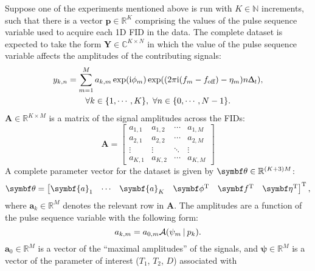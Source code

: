 Suppose one of the experiments mentioned above is run with $K \in \mathbb{N}$
increments,
such that there is a vector  $\symbf{p} \in \mathbb{R}^K$ comprising the
values of the pulse sequence variable used to acquire each \ac{1D} \ac{FID} in
the data.  The complete dataset is expected to take the form $\symbf{Y} \in
\mathbb{C}^{K \times N}$ in which the value of the pulse sequence variable
affects the amplitudes of the contributing signals:
\begin{equation}
    \begin{gathered}
        y_{k,n} = \sum_{m=1}^{M} a_{k,m} \exp(\mathrm{i} \phi_m)
        \exp((2 \pi \mathrm{i} (f_m - f_{\text{off}}) - \eta_m) n \Updelta_t),\\
        \forall k \in \lbrace 1, \cdots, K \rbrace,\ \forall n \in \lbrace 0,
        \cdots, N-1 \rbrace.
    \end{gathered}
\end{equation}
$\symbf{A} \in \mathbb{R}^{K \times M}$ is a matrix of the signal amplitudes
across the \acp{FID}:
\begin{equation}
    \symbf{A} =
    \begin{bmatrix}
        a_{1,1} & a_{1,2} & \cdots & a_{1,M}\\
        a_{2,1} & a_{2,2} & \cdots & a_{2,M}\\
        \vdots & \vdots & \ddots & \vdots\\
        a_{K,1} & a_{K,2} & \cdots & a_{K,M}
    \end{bmatrix}
\end{equation}
A complete parameter vector for the dataset is given by $\bth \in
\mathbb{R}^{(K + 3)M}$:
\begin{equation}
    \bth =
    \begin{bmatrix}
        \symbf{a}_1 & \cdots & \symbf{a}_K & \bdphi\T & \bdf\T & \bdeta\T
    \end{bmatrix}\T,
\end{equation}
where $\symbf{a}_k \in \mathbb{R}^M$ denotes the relevant row in $\symbf{A}$.
The amplitudes are a function of the pulse sequence variable with the following
form:
\begin{equation}
    a_{k,m} = a_{0,m} \mathcal{A} (\psi_m \hspace*{2pt} | \hspace*{2pt} p_k).
\end{equation}
$\symbf{a}_0 \in \mathbb{R}^{M}$ is a vector of the ``maximal
amplitudes'' of the signals, and $\symbf{\psi} \in \mathbb{R}^M$ is a vector
of the parameter of interest ($T_1$,  $T_2$, $D$) associated with

